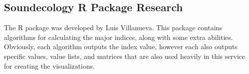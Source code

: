 \subsection{Soundecology R Package Research}
The  R package was developed by Luis Villanueva. This package contains algorithms for calculating the major indices, along with some extra abilities. Obviously, each algorithm outputs the index value, however each also outputs specific values, value lists, and matrices that are also used heavily in this service for creating the visualizations.







